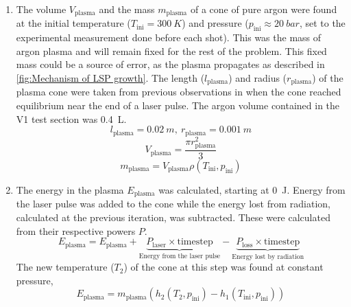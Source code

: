         \begin{enumerate}
            \item The volume $V_\mathrm{plasma}$ and the mass $m_\mathrm{plasma}$ of a cone of pure argon were found at the initial temperature ($T_\mathrm{ini} = \qty{300}{K}$) and pressure ($p_\mathrm{ini} \approx \qty{20}{bar}$, set to the experimental measurement done before each shot). This was the mass of argon plasma and will remain fixed for the rest of the problem. This fixed mass could be a source of error, as the plasma propagates as described in \autoref{fig:Mechanism of LSP growth}. The length ($l_\mathrm{plasma}$) and radius ($r_\mathrm{plasma}$) of the plasma cone were taken from previous observations in \textcite{duplayArgonLaserPlasmaThruster2024a} when the cone reached equilibrium near the end of a laser pulse. The argon volume contained in the V1 test section was \qty{0.4}{L}.
                \begin{equation}
                    l_\mathrm{plasma} = \qty{0.02}{m}, \: r_\mathrm{plasma} = \qty{0.001}{m}
                \end{equation}
                \begin{equation}
                    V_\mathrm{plasma} = \frac{\pi r_\mathrm{plasma}^2}{3}
                \end{equation}
                \begin{equation}
                    m_\mathrm{plasma} = V_\mathrm{plasma}\rho(T_\mathrm{ini}, p_\mathrm{ini})
                \end{equation}
            \item The energy in the plasma $E_\mathrm{plasma}$ was calculated, starting at \qty{0}{J}. Energy from the laser pulse was added to the cone while the energy lost from radiation, calculated at the previous iteration, was subtracted. These were calculated from their respective powers $P$.
                \begin{equation}
                    E_\mathrm{plasma} = E_\mathrm{plasma} + \underbrace{P_\mathrm{laser} \times \mathrm{timestep}}_\textrm{Energy from the laser pulse} - \underbrace{P_\mathrm{loss} \times \mathrm{timestep}}_\textrm{Energy lost by radiation}
                \end{equation}
                The new temperature ($T_2$) of the cone at this step was found at constant pressure,
                \begin{equation}
                    E_\mathrm{plasma} = m_\mathrm{plasma} \left(h_2 (T_2, p_\mathrm{ini}) - h_1(T_\mathrm{ini}, p_\mathrm{ini})\right)

\end{equation}
\end{enumerate}
